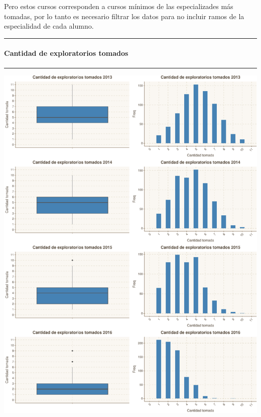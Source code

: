 \documentclass[]{article}
\let\oldparagraph\paragraph
\renewcommand{\paragraph}[1]{\oldparagraph{#1}\mbox{}}
\begin{document}
Pero estos cursos corresponden a cursos mínimos de las especializades
más tomadas, por lo tanto es necesario filtrar los datos para no incluir
ramos de la especialidad de cada alumno.

\newline   \newline

\begin{center}\rule{0.5\linewidth}{\linethickness}\end{center}

\paragraph{Cantidad de exploratorios
tomados}\label{cantidad-de-exploratorios-tomados}

\begin{center}\rule{0.5\linewidth}{\linethickness}\end{center}

\begin{center}\includegraphics{Figs/plot1-1} \end{center}
\end{document}
